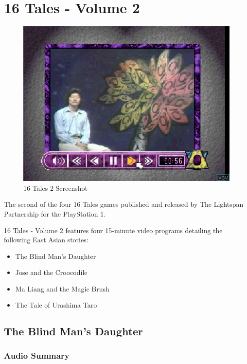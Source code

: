 \chapter{16 Tales - Volume 2}

\begin{figure}[H]
    \centering
    \includegraphics[width=\textwidth/2]{"./Games/16Tales/Images/16Tales2Screenshot.png"}
    \caption{16 Tales 2 Screenshot}
\end{figure}

The second of the four 16 Tales games published and released by The Lightspan Partnership for the PlayStation 1.

16 Tales - Volume 2 features four 15-minute video programs detailing the following East Asian stories:
\begin{itemize}
    \item The Blind Man's Daughter
    \item Jose and the Croocodile
    \item Ma Liang and the Magic Brush
    \item The Tale of Urashima Taro
\end{itemize}

\clearpage
\newpage

\section{The Blind Man's Daughter}

\subsection{Audio Summary}

